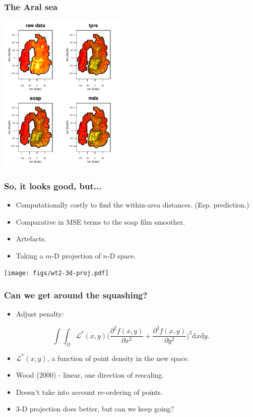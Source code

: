 \documentclass[ignorenonframetext]{beamer} %
\newcommand{\bi}{\begin{itemize}}
\newcommand{\ei}{\end{itemize}}
\begin{document}
\begin{frame}
	\frametitle{The Aral sea}
            \centering
              \includegraphics[height=3in]{figs/aral-fit.pdf}\\
\end{frame}

\begin{frame}
	\frametitle{So, it looks good, but...}
          \bi
            \item Computationally costly to find the within-area distances. (Esp. prediction.)
            \item Comparative in MSE terms to the soap film smoother.
            \item Artefacts.
            \item Taking a $m$-D projection of $n$-D space.
           \ei
            \centering
              \texttt{[image: figs/wt2-3d-proj.pdf]}\\           
\end{frame}

\begin{frame}
	\frametitle{Can we get around the squashing?}
          \bi
            \item Adjust penalty:
          \ei
            \begin{equation*}
            \int\int_\Omega \mathcal{L}^*(x,y) \Big(\frac{\partial^2 f(x,y)}{\partial x^2} + \frac{\partial^2 f(x,y)}{\partial y^2}\Big)^2 \text{d}x\text{d}y.
            \end{equation*}
            \bi
            \item $\mathcal{L}^*(x,y)$, a function of point density in the new space.
            \item Wood (2000) - linear, one direction of rescaling.
            \item  Doesn't take into account re-ordering of points.
            \item 3-D projection does better, but can we keep going?
          \ei
\end{frame}
\end{document}
